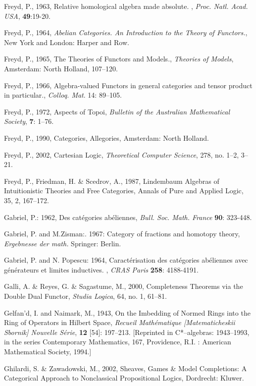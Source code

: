\documentclass[12pt]{article}
\theoremstyle{plain}
\theoremstyle{definition}
\numberwithin{equation}{section}
\begin{document}
\begin{thebibliography}{9}
Freyd, P., 1963, Relative homological algebra made absolute. , {\em Proc. Natl. Acad. USA}, \textbf{49}:19-20.
  
Freyd, P., 1964, {\em Abelian Categories. An Introduction to the Theory of Functors.}, New York and London: Harper and Row.  

Freyd, P., 1965, The Theories of Functors and Models., {\em Theories of Models}, Amsterdam: North Holland, 107--120. 

Freyd, P., 1966, Algebra-valued Functors in general categories and tensor product in particular., {\em Colloq. Mat}. 
{14}: 89--105.

Freyd, P., 1972, Aspects of Topoi, {\em Bulletin of the Australian Mathematical Society}, \textbf{7}: 1--76.  
 
Freyd, P., 1990, Categories, Allegories, Amsterdam: North Holland. 

Freyd, P., 2002, Cartesian Logic, {\em Theoretical Computer Science}, 278, no. 1--2, 3--21.  

Freyd, P., Friedman, H. \& Scedrov, A., 1987, Lindembaum Algebras of Intuitionistic Theories and Free Categories, Annals of Pure and Applied Logic, 35, 2, 167--172.

Gabriel, P.: 1962, Des cat\'egories ab\'eliennes, \emph{Bull. Soc. Math. France} \textbf{90}: 323-448.

Gabriel, P. and M.Zisman:. 1967: Category of fractions and homotopy theory, \emph{Ergebnesse der math.} Springer: Berlin.

Gabriel, P. and N. Popescu: 1964, Caract\'{e}risation des cat\'egories ab\'eliennes
avec g\'{e}n\'{e}rateurs et limites inductives. , \emph{CRAS Paris} \textbf{258}: 4188-4191.

Galli, A. \& Reyes, G. \& Sagastume, M., 2000, Completeness Theorems via the Double Dual Functor, {\em Studia Logica}, 64, no. 1, 61--81. 

Gelfan'd, I. and Naimark, M., 1943, On the Imbedding of Normed Rings into the Ring of Operators in Hilbert Space, {\em Recueil Math\'ematique [Matematicheskii Sbornik] Nouvelle S\'erie}, \textbf{12} [54]: 197--213. [Reprinted in C*--algebras: 
1943--1993, in the series Contemporary Mathematics, 167,  Providence, R.I. : 
American Mathematical Society, 1994.] 

Ghilardi, S. \& Zawadowski, M., 2002, Sheaves, Games \& Model Completions: A Categorical Approach to Nonclassical Propositional Logics, Dordrecht: Kluwer.  


\end{thebibliography}
\end{document}
